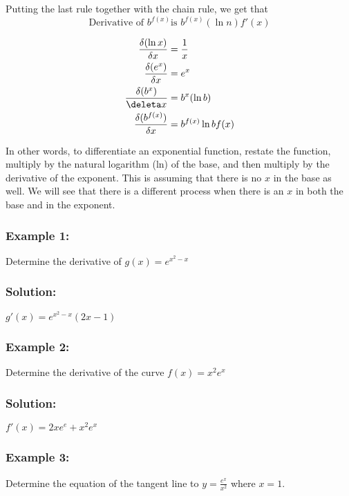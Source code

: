 \documentclass{article}
\begin{document}
Putting the last rule together with the chain rule, we get that
$$\text{Derivative of } b^{f(x)} \text{is } b^{f(x)}(\ln n)f'(x)$$
\begin{tcolorbox}[colback=blue!5!snow, colframe=white!50!white,
  colbacktitle=blue!75!mistyrose, title=Derivatives of Exponential Functions Rules]
    \begin{align*}
        \frac{\delta(\ln x)}{\delta x}&=\frac{1}{x}\\
        \frac{\delta(e^x)}{\delta x}&=e^x\\
        \frac{\delta (b^x)}{\deleta x}&= b^{x}(\ln b)\\
        \frac{\delta (b^{f(x)})}{\delta x}&=b^{f(x)}\ln b f(x)\\
    \end{align*}  
\end{tcolorbox}
In other words, to differentiate an exponential function, restate the function, multiply by the natural logarithm (ln) of the base, and then multiply by the derivative of the exponent. This is assuming that there is no $x$ in the base as well. We will see that there is a different process when there is an $x$ in both the base and in the exponent.

\subsubsection*{Example 1:}
Determine the derivative of $g(x)=e^{x^2-x}$
\subsubsection*{Solution: }
$g'(x)=e^{x^2-x}(2x-1)$
\subsubsection*{Example 2:}
Determine the derivative of the curve $f(x)=x^2e^x$
\subsubsection*{Solution:}
$f'(x)=2xe^e+x^2e^x$
\subsubsection*{Example 3:}
Determine the equation of the tangent line to $y=\frac{e^x}{x^2}$ where $x=1$.
\end{document}
